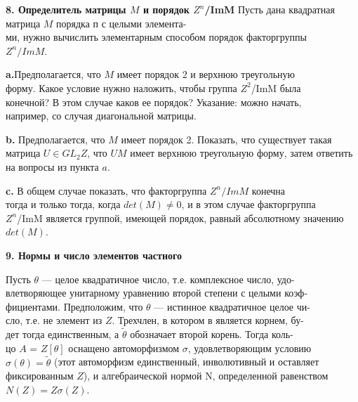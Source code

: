 \documentclass{../template/mai_book}
\begin{document}
\medskip

{\noindent\bf8. Определитель матрицы $M$ и порядок $\mathit{Z}^n$/ImM} 
Пусть дана квадратная матрица $M$ порядка п с целыми 
элемента-\\ми, нужно вычислить элементарным способом порядок факторгруппы\\ 
$\mathit{Z}^n/ImM$.

\pagebreak

{\bf a.}Предполагается, что $M$ имеет порядок 2 и верхнюю треугольную\\ 
форму. Какое условие нужно наложить, чтобы группа $\mathit{Z}^2$/ImM была\\ конечной? В этом случае каков ее порядок? Указание: можно начать,\\ например, со случая диагональной матрицы. 

\medskip

{\bf b.} Предполагается, что $M$ имеет порядок 2. Показать, что 
существует такая матрица $U \in GL_2\mathit{Z}$, что $UM$ имеет верхнюю 
треугольную форму, затем ответить на вопросы из пункта $a$. 

\medskip

{\bf c.} В общем случае показать, что факторгруппа $\mathit{Z}^n/ImM$ конечна \\
тогда и только тогда, когда $det(M)\ne 0$, и в этом случае факторгруппа \\
$\mathit{Z}^n$/ImM является группой, имеющей порядок, равный абсолютному 
значению $det(M)$.

\medskip

{\noindent\bf 9. Нормы и число элементов частного}

\medskip

Пусть $\theta$ — целое квадратичное число, т.е. комплексное число, 
удо-\\влетворяющее унитарному уравнению второй степени с целыми 
коэф-\\фициентами. Предположим, что $\theta$ — истинное квадратичное целое 
чи-\\сло, т.е. не элемент из $\mathit{Z}$. Трехчлен, в котором в является корнем, 
бу-\\дет тогда единственным, а $\tilde{\theta}$ обозначает второй корень. Тогда 
коль-\\цо $A$ = $\mathit{Z}[\theta]$ оснащено автоморфизмом $\sigma$, удовлетворяющим условию\\ 
$\sigma(\theta) = \tilde{\theta}$ (этот автоморфизм единственный, инволютивный и оставляет\\ 
фиксированным $\mathit{Z}$), и алгебраической нормой N, определенной 
равенством $N(Z) = Z\sigma(Z)$. 
\end{document}
